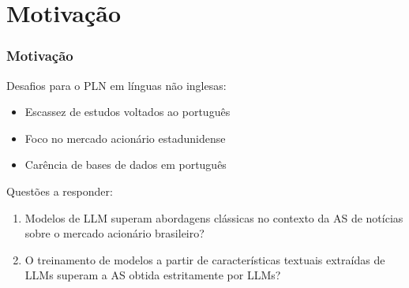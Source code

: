 \section{Motivação} %


\begin{frame}
    \frametitle{Motivação}
    Desafios para o PLN em línguas não inglesas:
    \begin{itemize}
        \item Escassez de estudos voltados ao português
        \item Foco no mercado acionário estadunidense
        \item Carência de bases de dados em português
    \end{itemize}
	\bigskip
    Questões a responder:
    \begin{enumerate}
        \item Modelos de LLM superam abordagens clássicas no contexto da AS de notícias sobre o mercado acionário brasileiro?
        \item O treinamento de modelos a partir de características textuais extraídas de LLMs superam a AS obtida estritamente por LLMs?
    \end{enumerate}
\end{frame}

